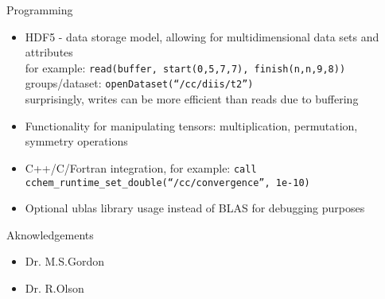 \documentclass{beamer}
\begin{document}
\begin{frame}{Programming }
  \begin{itemize}
  \item  HDF5 - data storage model, allowing for multidimensional data
    sets and attributes \\
    for example: {\tt read(buffer, start(0,5,7,7),  finish(n,n,9,8)) }\\
    groups/dataset: {\tt openDataset(``/cc/diis/t2'') } \\
    surprisingly, writes can be more efficient than reads due to buffering
  \item Functionality for manipulating tensors: multiplication,
     permutation, symmetry operations
  \item C++/C/Fortran integration,
    for example: {\tt call cchem\_runtime\_set\_double(``/cc/convergence'',
    1e-10) }
  \item Optional ublas library usage instead of BLAS for debugging purposes
  \end{itemize}
\end{frame}


\begin{frame}{Aknowledgements}
  \begin{itemize}
  \item Dr. M.S.Gordon
  \item Dr. R.Olson 
  \end{itemize}
\end{frame}
\end{document}
